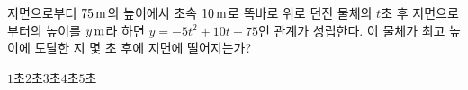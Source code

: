 지면으로부터 $75\mkern3mu \mathrm{m}$의 높이에서 초속 $10\mkern3mu \mathrm{m}$로 똑바로 위로 던진 물체의 $t$초 후 지면으로부터의 높이를 $y\mkern3mu \mathrm{m}$라 하면 $y=-5t^2+10t+75$인 관계가 성립한다. 이 물체가 최고 높이에 도달한 지 몇 초 후에 지면에 떨어지는가?
\begin{choices32}{$1$초}{$2$초}{$3$초}{$4$초}{$5$초}\end{choices32}
